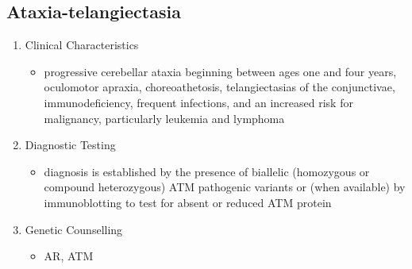 \documentclass[12pt]{scrartcl}
\begin{document}
\subsection{Ataxia-telangiectasia}
\label{sec:org1b2c357}
\begin{enumerate}
\item Clinical Characteristics
\label{sec:org7601ca2}
\begin{itemize}
\item progressive cerebellar ataxia beginning between ages one and four
years, oculomotor apraxia, choreoathetosis, telangiectasias of the
conjunctivae, immunodeficiency, frequent infections, and an
increased risk for malignancy, particularly leukemia and lymphoma
\end{itemize}
\item Diagnostic Testing
\label{sec:orgb6d2cf8}
\begin{itemize}
\item diagnosis is established by the presence of biallelic (homozygous or
compound heterozygous) ATM pathogenic variants or (when available)
by immunoblotting to test for absent or reduced ATM protein
\end{itemize}

\item Genetic Counselling
\label{sec:orgdf86c22}
\begin{itemize}
\item AR, ATM
\end{itemize}
\end{enumerate}
\end{document}
